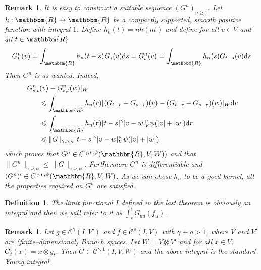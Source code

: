 \documentclass[a4paper,11pt]{article}
\newcommand{\mathd}{\mathrm{d}}
\newtheorem{definition}[theorem]{Definition}
\newtheorem{remark}[theorem]{Remark}
\newcommand{\CC}{\mathscr C}
\begin{document}
\begin{remark}
  It is easy to construct a suitable sequence $(G^{n} )_{n \ge 1}$. Let
  $h:\mathbbm{R} \to \mathbbm{R}$ be a compactly supported, smooth positive
  function with integral $1$. Define $h_{n} (t) =nh (nt)$ and define for all
  $v \in V$ and all $t \in \mathbbm{R}$
  \[ G_{t}^{n} (v) = \int_{\mathbbm{R}} h_{n}  (t-s) G_{s} (v) \mathd
     s=G_{t}^{n} (v) = \int_{\mathbbm{R}} h_{n} (s) G_{t-s} (v) \mathd s \]
  Then $G^{n}$ is as wanted. Indeed,
  \begin{equation} \begin{split}
       & | G_{s,t}^{n} (v)-G_{s,t}^{n} (w) |_{W}\\
       & \hspace{2em} \leqslant \int_{\mathbbm{R}} h_{n} (r) | ( G_{t-r}
       -G_{s-r} ) (v)- ( G_{t-r} -G_{s-r} ) (w) |_{W} \mathd r\\
       & \hspace{2em} \leqslant \int_{\mathbbm{R}} h_{n} (r) | t-s |^{\gamma}
       |v-w|^{\nu}_{V} \psi ( | v | + | w | ) \mathd r\\
       & \hspace{2em} \leqslant \|G\|_{\gamma , \nu , \psi} |t-s|^{\gamma}
       |v-w|^{\nu}_{V}   \psi ( | v | + | w | )
     \end{split} \end{equation}
  which proves that $G^{n} \in C^{\gamma , \nu , \psi} (\mathbbm{R},V,W) )$
  and that $\|G^{n} \|_{\gamma , \nu , \psi} \leqslant \|G\|_{\gamma , \nu ,
  \psi}$. Furthermore $G^{n}$ is differentiable and $(G^{n} )' \in C^{\gamma ,
  \nu , \psi} (\mathbbm{R},V,W)$. As we can chose $h_{n}$ to be a good kernel,
  all the properties required on $G^{n}$ are satisfied.
\end{remark}

\begin{definition}
  The limit functional $I$ defined in the last theorem is obviously an
  integral and then we will refer to it as $\int_{s}^{t} G_{du} (f_{u} )$.
\end{definition}

\begin{remark}
  Let $g \in \CC^{\gamma} (I,V' )$ and $f \in \CC^{\rho} (I,V)$ with $\gamma +
  \rho >1$, where $V$ and $V'$ are (finite--dimensional) Banach spaces. Let
  $W=V \otimes V'$ and for all $x \in V$, $G_{t} (x) =x \otimes g_{t}$. Then
  $G \in \CC^{\gamma ,1} (I,V,W)$ and the above integral is the standard Young
  integral.
\end{remark}
\end{document}
